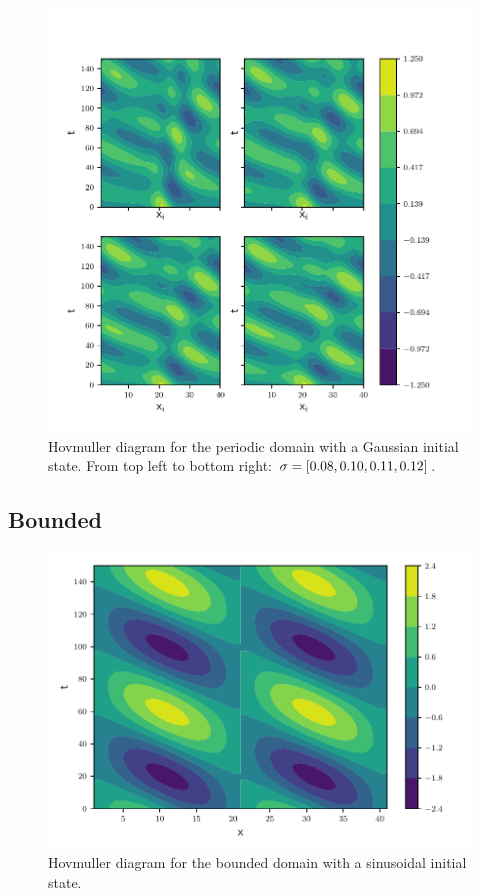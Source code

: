 \begin{figure}[htp]
  \centering
  \includegraphics[width=\textwidth]{../figures/hovmuller_sigma.pdf}
  \caption{Hovmuller diagram for the periodic domain with a Gaussian initial
  state.
  From top left to bottom right: $\sigma = \left[0.08, 0.10, 0.11, 0.12\right]$.
  }
  \label{fig:periodic_gauss}
\end{figure}



\subsection{Bounded}

\begin{figure}[htp]
  \centering
  \includegraphics[width=\textwidth]{../figures/psi_bounded_centered_sine.pdf}
  \caption{Hovmuller diagram for the bounded domain with a sinusoidal initial
  state.}
  \label{fig:bounded_sine}
\end{figure}


